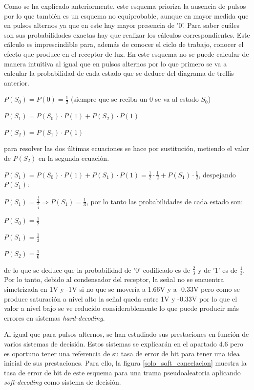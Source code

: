 Como se ha explicado anteriormente, este esquema prioriza la ausencia de pulsos por
lo que también es un esquema no equiprobable, aunque en mayor medida que en pulsos
alternos ya que en este hay mayor presencia de '0'. Para saber cuáles son sus 
probabilidades exactas hay que realizar los cálculos correspondientes. Este cálculo es 
imprescindible para, además de conocer el ciclo de trabajo, conocer el efecto que 
produce en el receptor de luz. En este esquema no se puede calcular de manera 
intuitiva al igual que en pulsos alternos por lo que primero se va a calcular la 
probabilidad de cada estado que se deduce del diagrama de trellis anterior. \cite{anto_cancel}

$ P(S_0) = P(0) = \frac{1}{2} $ (siempre que se reciba un 0 se va al estado $S_0$)

$ P(S_1) = P(S_0) \cdot P(1) + P(S_2) \cdot P(1) $

$ P(S_2) = P(S_1) \cdot P(1) $

para resolver las dos últimas ecuaciones se hace por sustitución, metiendo el valor de 
$P(S_2)$ en la segunda ecuación. 

$ P(S_1) = P(S_0) \cdot P(1) + P(S_1) \cdot P(1) = \frac{1}{2} \cdot \frac{1}{2} 
+ P(S_1) \cdot \frac{1}{2} $, despejando $P(S_1)$:

$ P(S_1) = \frac{\frac{1}{4}}{\frac{3}{4}} \Rightarrow P(S_1) = \frac{1}{3} $, por lo 
tanto las probabilidades de cada estado son:

$ P(S_0) = \frac{1}{2} $

$ P(S_1) = \frac{1}{3} $

$ P(S_2) = \frac{1}{6} $

de lo que se deduce que la probabilidad de '0' codificado es de $\frac{2}{3}$ y de 
'1' es de $\frac{1}{3}$. Por lo tanto, debido al condensador del receptor, la señal 
no se encuentra simetrizada en 1V y -1V si no que se movería a 1.66V y a -0.33V pero como 
se produce saturación a nivel alto la señal queda entre 1V y -0.33V por lo que el valor
a nivel bajo se ve reducido considerablemente lo que puede producir más errores en 
sistemas \textit{hard-decoding}.

Al igual que para pulsos alternos, se han estudiado sus prestaciones en función de varios 
sistemas de decisión. Estos sistemas se explicarán en el apartado 4.6 pero es oportuno 
tener una referencia de su tasa de error de bit para tener una idea inicial de sus 
prestaciones. Para ello, la figura \ref{solo_soft_cancelacion} muestra la tasa de error 
de bit de este esquema
para una trama pseudoaleatoria aplicando \textit{soft-decoding} como sistema de decisión. 

